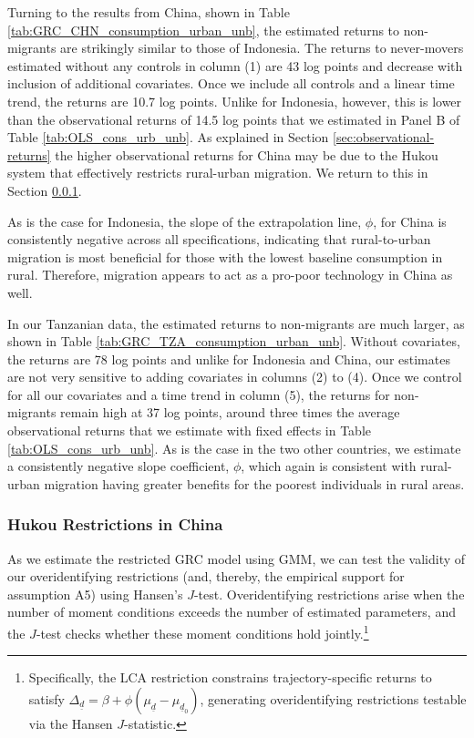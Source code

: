 \documentclass[12pt]{article}
\begin{document}
Turning to the results from China, shown in Table \ref{tab:GRC_CHN_consumption_urban_unb}, the estimated returns to non-migrants are strikingly similar to those of Indonesia. 
The returns to never-movers estimated without any controls in column (1) are 43 log points and decrease with inclusion of additional covariates. 
Once we include all controls and a linear time trend, the returns are 10.7 log points. Unlike for Indonesia, however, this is lower than the observational returns of 14.5 log points that we estimated in Panel B of Table \ref{tab:OLS_cons_urb_unb}. 
As explained in Section \ref{sec:observational-returns} the higher observational returns for China may be due to the Hukou system that effectively restricts rural-urban migration.
We return to this in Section \ref{sec:hukou}.

As is the case for Indonesia, the slope of the extrapolation line, $\phi$, for China is consistently negative across all specifications, indicating that rural-to-urban migration is most beneficial for those with the lowest baseline consumption in rural.
Therefore, migration appears to act as a pro-poor technology in China as well.

In our Tanzanian data, the estimated returns to non-migrants are much larger, as shown in Table \ref{tab:GRC_TZA_consumption_urban_unb}. 
Without covariates, the returns are 78 log points and unlike for Indonesia and China, our estimates are not very sensitive to adding covariates in columns (2) to (4). 
Once we control for all our covariates and a time trend in column (5), the returns for non-migrants remain high at 37 log points, around three times the average observational returns that we estimate with fixed effects in Table \ref{tab:OLS_cons_urb_unb}.
As is the case in the two other countries, we estimate a consistently negative slope coefficient, $\phi$, which again is consistent with rural-urban migration having greater benefits for the poorest individuals in rural areas.

\subsubsection{Hukou Restrictions in China}\label{sec:hukou}

As we estimate the restricted GRC model using GMM, we can test the validity of our overidentifying restrictions (and, thereby, the empirical support for assumption A5) using Hansen's $J$-test. 
Overidentifying restrictions arise when the number of moment conditions exceeds the number of estimated parameters, and the $J$-test checks whether these moment conditions hold jointly.\footnote{Specifically, the LCA restriction constrains trajectory-specific returns to satisfy $\Delta_{\underline{d}} = \beta + \phi(\mu_{\underline{d}} - \mu_{\underline{d}_0})$, generating overidentifying restrictions testable via the Hansen $J$-statistic. }
\end{document}
